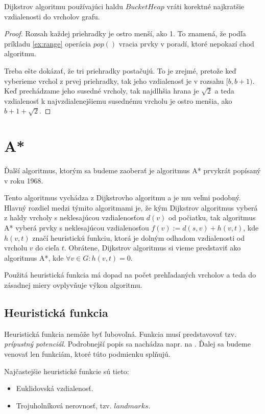 \begin{theorem}
Dijkstrov algoritmu používajúci haldu $BucketHeap$ vráti korektné najkratšie vzdialenosti do vrcholov grafu.
\end{theorem}
\begin{proof}
Rozsah každej priehradky je ostro menší, ako 1. To znamená, že podľa príkladu \ref{ex:range} operácia $pop()$ vracia prvky v poradí, ktoré
nepokazí chod algoritmu. 

Treba ešte dokázať, že tri priehradky postačujú. To je zrejmé,
pretože keď vyberieme vrchol z prvej priehradky, tak jeho vzdialenosť je v rozsahu $[b, b+1)$. Keď prechádzame jeho susedné vrcholy, tak najdlhšia hrana je $ \sqrt{2} $ a teda vzdialenosť k najvzdialenejšiemu susednému vrcholu je ostro menšia, ako $b+1+\sqrt{2}$.
\end{proof}


\section{A*}
Ďalší algoritmus, ktorým sa budeme zaoberať je algoritmus
A* \cite{astar72} prvykrát popísaný v roku 1968.

Tento algoritmus vychádza z Dijkstrovho algoritmu a je mu veľmi podobný. Hlavný rozdiel medzi týmito algoritmami je, že
kým Dijkstrov algoritmus vyberá z haldy vrcholy s neklesajúcou vzdialenosťou $ d(v) $ od počiatku, tak algoritmus A* vyberá prvky s neklesajúcou vzdialenosťou $ f(v) := d(s,v) + h(v,t) $, kde $ h(v, t) $ značí heuristickú funkciu, ktorá je dolným odhadom vzdialenosti od vrcholu $ v $ do cieľa $ t $. Obrátene, Dijkstrov algoritmus si vieme predstaviť ako algoritmus A*, kde $ \forall v \in G: h(v, t) = 0 $.

Použitá heuristická funkcia má dopad na počet prehľadaných vrcholov a teda do zásadnej miery ovplyvňuje výkon algoritmu.

\subsection{Heuristická funkcia}
 Heuristická funkcia nemôže byť ľubovoľná. Funkcia musí predstavovať tzv. {\sl prípustný potenciál}. Podrobnejší popis sa nachádza napr. na \cite{mares07} \cite{golberg01} \cite{goldbergharrelson05}. Ďalej sa budeme venovať len funkciám, ktoré túto podmienku splňujú.


Najčastejšie heuristické funkcie sú tieto:

\begin{itemize}
\item Euklidovská vzdialenosť.
\item Trojuholníková nerovnosť, tzv. $ landmarks $.
\end{itemize}


